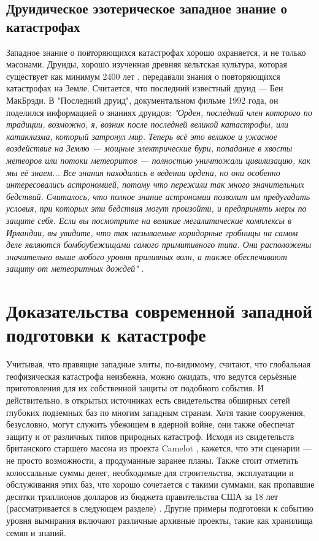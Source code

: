 \documentclass[10pt,twocolumn,letterpaper]{article}
\begin{document}
\subsection{Друидическое эзотерическое западное знание о катастрофах}

Западное знание о повторяющихся катастрофах хорошо охраняется, и не только масонами. Друиды, хорошо изученная древняя кельтская культура, которая существует как минимум 2400 лет \cite{7}, передавали знания о повторяющихся катастрофах на Земле. Считается, что последний известный друид — Бен МакБрэди. В "Последний друид", документальном фильме 1992 года, он поделился информацией о знаниях друидов: \textit{"Орден, последний член которого по традиции, возможно, я, возник после последней великой катастрофы, или катаклизма, который затронул мир. Теперь всё это великое и ужасное воздействие на Землю — мощные электрические бури, попадание в хвосты метеоров или потоки метеоритов — полностью уничтожали цивилизацию, как мы её знаем... Все знания находились в ведении ордена, но они особенно интересовались астрономией, потому что пережили так много значительных бедствий. Считалось, что полное знание астрономии позволит им предугадать условия, при которых эти бедствия могут произойти, и предпринять меры по защите себя. Если вы посмотрите на великие мегалитические комплексы в Ирландии, вы увидите, что так называемые коридорные гробницы на самом деле являются бомбоубежищами самого примитивного типа. Они расположены значительно выше любого уровня приливных волн, а также обеспечивают защиту от метеоритных дождей"} \cite{8,9}.


\section{Доказательства современной западной подготовки к катастрофе}

Учитывая, что правящие западные элиты, по-видимому, считают, что глобальная геофизическая катастрофа неизбежна, можно ожидать, что ведутся серьёзные приготовления для их собственной защиты от подобного события. И действительно, в открытых источниках есть свидетельства обширных сетей глубоких подземных баз по многим западным странам. Хотя такие сооружения, безусловно, могут служить убежищем в ядерной войне, они также обеспечат защиту и от различных типов природных катастроф. Исходя из свидетельств британского старшего масона из проекта Camelot \cite{4,6}, кажется, что эти сценарии — не просто возможности, а продуманные заранее планы. Также стоит отметить колоссальные суммы денег, необходимые для строительства, эксплуатации и обслуживания этих баз, что хорошо сочетается с такими суммами, как пропавшие десятки триллионов долларов из бюджета правительства США за 18 лет (рассматривается в следующем разделе) \cite{11,12,13}. Другие примеры подготовки к событию уровня вымирания включают различные архивные проекты, такие как хранилища семян и знаний.
\end{document}
